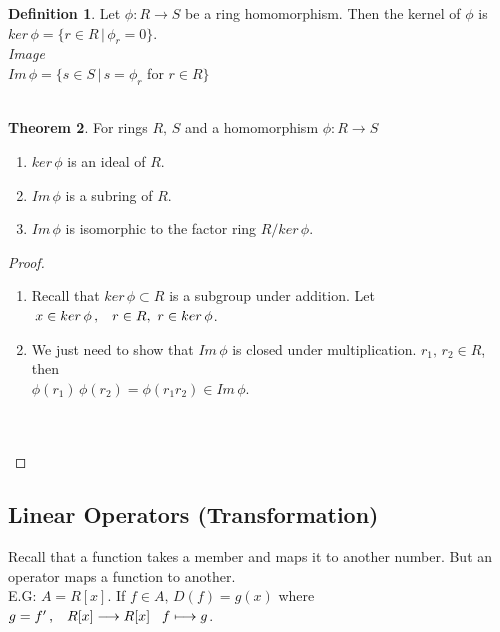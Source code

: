 \documentclass[11pt,a4paper]{article}
\theoremstyle{definition}
\newtheorem{thm}{Theorem}[subsection]
\newtheorem{defn}[thm]{Definition}
\begin{document}
\begin{defn}
Let $\phi : R \longrightarrow S$ be a ring homomorphism. Then the kernel of $\phi$ is $ker\, \phi = \{r\in R\, |\, \phi_r = 0\}$.\\


\textit{Image}\\
$Im \,\phi = \{s\in S\, |\, s = \phi_r$ for $r \in R\}$\\\\






\pagebreak
\end{defn}
\begin{thm}
For rings $R,\, S$ and a homomorphism $\phi : R\longrightarrow S$
\begin{enumerate}
\item $ker\, \phi$ is an ideal of $R$.
\item $Im\, \phi$ is a subring of $R$.
\item $Im\, \phi$ is isomorphic to the factor ring $R/ker\, \phi$.\\
\end{enumerate}
\end{thm}


\begin{proof}
\begin{enumerate}
\item Recall that $ker\, \phi \subset R$ is a subgroup under addition. Let $\, x\in ker\,\phi\,,\hspace{0.3cm} r\in R,\,\, r\in ker\,\phi$.

\item We just need to show that $Im\, \phi$ is closed under multiplication. $r_1, \, r_2 \in R$, then\\ $\phi(r_1)\,\phi(r_2) = \phi (r_1r_2)\in Im\, \phi$.\\\\\\
\end{enumerate}
\end{proof}












\subsection{Linear Operators (Transformation)}
Recall that a function takes a member and maps it to another number. But an operator maps a function to another.\\
E.G: $A = R[x]$. If $f\in A,\, D(f) = g(x) $ where $g = f'\,,\hspace{0.3cm} R[x] \longrightarrow R[x] \hspace{0.3cm} f\longmapsto g$.\\\\
\end{document}
